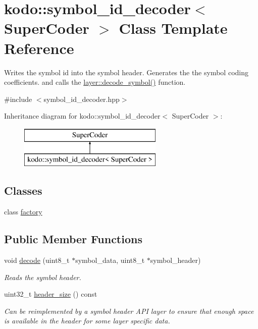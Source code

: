 \hypertarget{classkodo_1_1symbol__id__decoder}{\section{kodo\-:\-:symbol\-\_\-id\-\_\-decoder$<$ Super\-Coder $>$ Class Template Reference}
\label{classkodo_1_1symbol__id__decoder}
}


Writes the symbol id into the symbol header. Generates the the symbol coding coefficients. and calls the \hyperlink{group__decoder__api_gae28d93bf78534b4f4f4052ad6b1f7a4d}{layer\-::decode\-\_\-symbol()} function.  




{\ttfamily \#include $<$symbol\-\_\-id\-\_\-decoder.\-hpp$>$}

Inheritance diagram for kodo\-:\-:symbol\-\_\-id\-\_\-decoder$<$ Super\-Coder $>$\-:\begin{figure}[H]
\begin{center}
\leavevmode
\includegraphics[height=2.000000cm]{classkodo_1_1symbol__id__decoder}
\end{center}
\end{figure}
\subsection*{Classes}
\begin{DoxyCompactItemize}
\item 
class \hyperlink{classkodo_1_1symbol__id__decoder_1_1factory}{factory}
\end{DoxyCompactItemize}
\subsection*{Public Member Functions}
\begin{DoxyCompactItemize}
\item 
void \hyperlink{classkodo_1_1symbol__id__decoder_a08fb5f29a6e6ab8b940fc9ae1ae1245c}{decode} (uint8\-\_\-t $\ast$symbol\-\_\-data, uint8\-\_\-t $\ast$symbol\-\_\-header)
\begin{DoxyCompactList}\small\item\em Reads the symbol header. \end{DoxyCompactList}\item 
uint32\-\_\-t \hyperlink{classkodo_1_1symbol__id__decoder_a91524c79431549568b3cfb655c28492e}{header\-\_\-size} () const 
\begin{DoxyCompactList}\small\item\em Can be reimplemented by a symbol header A\-P\-I layer to ensure that enough space is available in the header for some layer specific data. \end{DoxyCompactList}\end{DoxyCompactItemize}


